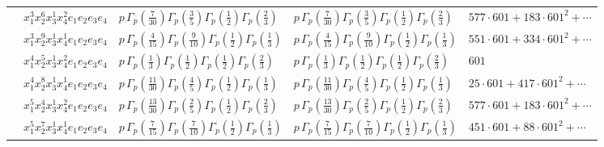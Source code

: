 \documentclass[11pt]{article}
\begin{document}
\begin{table}[ht]
{\begin{tabular}{@{}lllll@{}}
 & $x_{1}^{3} x_{2}^{6} x_{3}^{1} x_{4}^{2}  e_{1} e_{2} e_{3} e_{4}$ & $p \, \Gamma_p \left( \frac{7}{30} \right) \Gamma_p \left( \frac{3}{5} \right) \Gamma_p \left( \frac{1}{2} \right) \Gamma_p \left( \frac{2}{3} \right)$ & $p \, \Gamma_p \left( \frac{7}{30} \right) \Gamma_p \left( \frac{3}{5} \right) \Gamma_p \left( \frac{1}{2} \right) \Gamma_p \left( \frac{2}{3} \right)$ & $577{\cdot}601{+}183{\cdot}601^{2}{+}\cdots$ \\
 & $x_{1}^{3} x_{2}^{9} x_{3}^{1} x_{4}^{1}  e_{1} e_{2} e_{3} e_{4}$ & $p \, \Gamma_p \left( \frac{4}{15} \right) \Gamma_p \left( \frac{9}{10} \right) \Gamma_p \left( \frac{1}{2} \right) \Gamma_p \left( \frac{1}{3} \right)$ & $p \, \Gamma_p \left( \frac{4}{15} \right) \Gamma_p \left( \frac{9}{10} \right) \Gamma_p \left( \frac{1}{2} \right) \Gamma_p \left( \frac{1}{3} \right)$ & $551{\cdot}601{+}334{\cdot}601^{2}{+}\cdots$ \\
 & $x_{1}^{4} x_{2}^{5} x_{3}^{1} x_{4}^{2}  e_{1} e_{2} e_{3} e_{4}$ & $p \, \Gamma_p \left( \frac{1}{3} \right) \Gamma_p \left( \frac{1}{2} \right) \Gamma_p \left( \frac{1}{2} \right) \Gamma_p \left( \frac{2}{3} \right)$ & $p \, \Gamma_p \left( \frac{1}{3} \right) \Gamma_p \left( \frac{1}{2} \right) \Gamma_p \left( \frac{1}{2} \right) \Gamma_p \left( \frac{2}{3} \right)$ & $601$ \\
 & $x_{1}^{4} x_{2}^{8} x_{3}^{1} x_{4}^{1}  e_{1} e_{2} e_{3} e_{4}$ & $p \, \Gamma_p \left( \frac{11}{30} \right) \Gamma_p \left( \frac{4}{5} \right) \Gamma_p \left( \frac{1}{2} \right) \Gamma_p \left( \frac{1}{3} \right)$ & $p \, \Gamma_p \left( \frac{11}{30} \right) \Gamma_p \left( \frac{4}{5} \right) \Gamma_p \left( \frac{1}{2} \right) \Gamma_p \left( \frac{1}{3} \right)$ & $25{\cdot}601{+}417{\cdot}601^{2}{+}\cdots$ \\
 & $x_{1}^{5} x_{2}^{4} x_{3}^{1} x_{4}^{2}  e_{1} e_{2} e_{3} e_{4}$ & $p \, \Gamma_p \left( \frac{13}{30} \right) \Gamma_p \left( \frac{2}{5} \right) \Gamma_p \left( \frac{1}{2} \right) \Gamma_p \left( \frac{2}{3} \right)$ & $p \, \Gamma_p \left( \frac{13}{30} \right) \Gamma_p \left( \frac{2}{5} \right) \Gamma_p \left( \frac{1}{2} \right) \Gamma_p \left( \frac{2}{3} \right)$ & $577{\cdot}601{+}183{\cdot}601^{2}{+}\cdots$ \\
 & $x_{1}^{5} x_{2}^{7} x_{3}^{1} x_{4}^{1}  e_{1} e_{2} e_{3} e_{4}$ & $p \, \Gamma_p \left( \frac{7}{15} \right) \Gamma_p \left( \frac{7}{10} \right) \Gamma_p \left( \frac{1}{2} \right) \Gamma_p \left( \frac{1}{3} \right)$ & $p \, \Gamma_p \left( \frac{7}{15} \right) \Gamma_p \left( \frac{7}{10} \right) \Gamma_p \left( \frac{1}{2} \right) \Gamma_p \left( \frac{1}{3} \right)$ & $451{\cdot}601{+}88{\cdot}601^{2}{+}\cdots$ \\

\end{tabular}}
\end{table}
\end{document}
